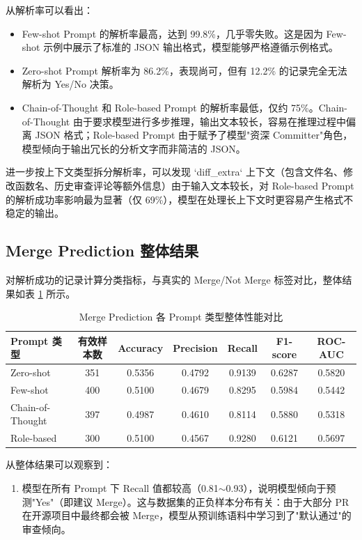 \documentclass{experimentreport}
\begin{document}
{从解析率可以看出：

\begin{itemize}
  \item Few-shot Prompt 的解析率最高，达到 99.8\%，几乎零失败。这是因为 Few-shot 示例中展示了标准的 JSON 输出格式，模型能够严格遵循示例格式。
  \item Zero-shot Prompt 解析率为 86.2\%，表现尚可，但有 12.2\% 的记录完全无法解析为 Yes/No 决策。
  \item Chain-of-Thought 和 Role-based Prompt 的解析率最低，仅约 75\%。Chain-of-Thought 由于要求模型进行多步推理，输出文本较长，容易在推理过程中偏离 JSON 格式；Role-based Prompt 由于赋予了模型"资深 Committer"角色，模型倾向于输出冗长的分析文字而非简洁的 JSON。
\end{itemize}

进一步按上下文类型拆分解析率，可以发现 `diff_extra` 上下文（包含文件名、修改函数名、历史审查评论等额外信息）由于输入文本较长，对 Role-based Prompt 的解析成功率影响最为显著（仅 69\%），模型在处理长上下文时更容易产生格式不稳定的输出。

\subsection{Merge Prediction 整体结果}

对解析成功的记录计算分类指标，与真实的 Merge/Not Merge 标签对比，整体结果如表 \ref{tab:merge_overall} 所示。

\begin{table}[htbp]
  \centering
  \caption{Merge Prediction 各 Prompt 类型整体性能对比}
  \label{tab:merge_overall}
  \begin{tabular}{lcccccc}
    \hline
    Prompt 类型 & 有效样本数 & Accuracy & Precision & Recall & F1-score & ROC-AUC \\
    \hline
    Zero-shot & 351 & 0.5356 & 0.4792 & 0.9139 & 0.6287 & 0.5820 \\
    Few-shot & 400 & 0.5100 & 0.4679 & 0.8295 & 0.5984 & 0.5442 \\
    Chain-of-Thought & 397 & 0.4987 & 0.4610 & 0.8114 & 0.5880 & 0.5318 \\
    Role-based & 300 & 0.5100 & 0.4567 & 0.9280 & 0.6121 & 0.5697 \\
    \hline
  \end{tabular}
\end{table}

从整体结果可以观察到：

\begin{enumerate}
  \item 模型在所有 Prompt 下 Recall 值都较高（0.81$\sim$0.93），说明模型倾向于预测"Yes"（即建议 Merge）。这与数据集的正负样本分布有关：由于大部分 PR 在开源项目中最终都会被 Merge，模型从预训练语料中学习到了"默认通过"的审查倾向。


\end{enumerate}}
\end{document}

